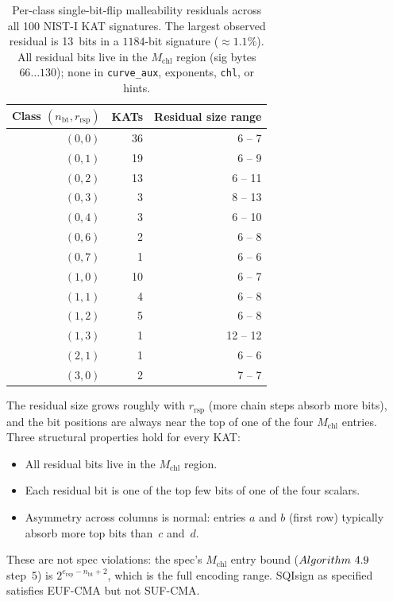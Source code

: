 \begin{table}[ht]
\centering
\small
\begin{tabular}{@{}rrr@{}}
\toprule
\textbf{Class $(n_{\mathrm{bt}}, r_{\mathrm{rsp}})$} & \textbf{KATs}
& \textbf{Residual size range} \\
\midrule
$(0, 0)$  & 36 & 6 -- 7 \\
$(0, 1)$  & 19 & 6 -- 9 \\
$(0, 2)$  & 13 & 6 -- 11 \\
$(0, 3)$  &  3 & 8 -- 13 \\
$(0, 4)$  &  3 & 6 -- 10 \\
$(0, 6)$  &  2 & 6 -- 8 \\
$(0, 7)$  &  1 & 6 -- 6 \\
$(1, 0)$  & 10 & 6 -- 7 \\
$(1, 1)$  &  4 & 6 -- 8 \\
$(1, 2)$  &  5 & 6 -- 8 \\
$(1, 3)$  &  1 & 12 -- 12 \\
$(2, 1)$  &  1 & 6 -- 6 \\
$(3, 0)$  &  2 & 7 -- 7 \\
\bottomrule
\end{tabular}
\caption{Per-class single-bit-flip malleability residuals across
all 100 NIST-I KAT signatures.  The largest observed residual is
13~bits in a $1184$-bit signature ($\approx 1.1\%$).  All residual
bits live in the $M_{\mathrm{chl}}$ region (sig bytes
$66\ldots 130$); none in \texttt{curve\_aux}, exponents,
\texttt{chl}, or hints.}
\label{tab:bit-flip-residuals}
\end{table}

The residual size grows roughly with $r_{\mathrm{rsp}}$ (more chain
steps absorb more bits), and the bit positions are always near
the top of one of the four $M_{\mathrm{chl}}$ entries.  Three
structural properties hold for every KAT:
\begin{itemize}[nosep]
\item All residual bits live in the $M_{\mathrm{chl}}$ region.
\item Each residual bit is one of the top few bits of one of the
  four scalars.
\item Asymmetry across columns is normal: entries $a$ and $b$
  (first row) typically absorb more top bits than~$c$ and~$d$.
\end{itemize}

These are not spec violations: the spec's $M_{\mathrm{chl}}$ entry
bound ($Algorithm~4.9$ step~5) is $2^{e_{\mathrm{rsp}} -
n_{\mathrm{bt}} + 2}$, which is the full encoding range.  SQIsign
as specified satisfies EUF-CMA but not SUF-CMA.

